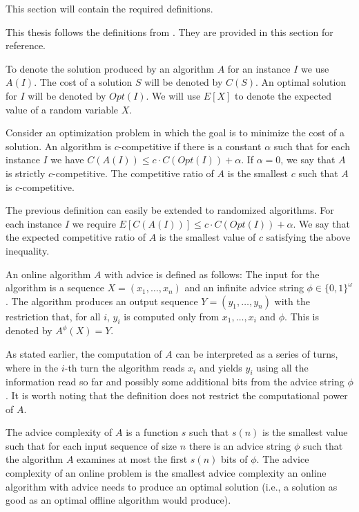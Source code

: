 This section will contain the required definitions. 


This thesis follows the definitions from \cite{misof-trivial-graphs}. They
are provided in this section for reference.

To denote the solution produced by an algorithm $A$ for an instance $I$ we
use $A(I)$. The cost of a solution $S$ will be denoted by $C(S)$. An
optimal solution for $I$ will be denoted by $Opt(I)$. We will use $E[X]$
to denote the expected value of a random variable $X$.

\begin{definition}\label{def:competitive-ratio}
    Consider an optimization problem in which the goal is to minimize the
    cost of a solution. An algorithm is $c$-competitive if there is a
    constant $\alpha$ such that for each instance $I$ we have $C(A(I))
    \leq c \cdot C(Opt(I)) + \alpha$.  If $\alpha = 0$, we say that $A$ is
    strictly $c$-competitive. The competitive ratio of $A$ is the smallest
    $c$ such that $A$ is $c$-competitive.
\end{definition}

The previous definition can easily be extended to randomized algorithms.
For each instance $I$ we require $E[C(A(I))] \leq c \cdot C(Opt(I)) +
\alpha$. We say that the expected competitive ratio of $A$ is the smallest
value of $c$ satisfying the above inequality.

\begin{definition}\label{def:online-advice}
    An online algorithm $A$ with advice is defined as follows: The input
    for the algorithm is a sequence $X = (x_1, \dots, x_n)$ and an
    infinite advice string $\phi \in \{0, 1\}^\omega$. The algorithm
    produces an output sequence $Y = (y_1, \dots, y_n)$ with the
    restriction that, for all $i$, $y_i$ is computed only from $x_1,
    \dots, x_i$ and $\phi$. This is denoted by $A^\phi(X) = Y$.
\end{definition}

As stated earlier, the computation of $A$ can be interpreted as a series
of turns, where in the $i$-th turn the algorithm reads $x_i$ and yields
$y_i$ using all the information read so far and possibly some additional
bits from the advice string $\phi$. It is worth noting that the definition
does not restrict the computational power of $A$.

\begin{definition}\label{def:advice-complexity}
    The advice complexity of $A$ is a function $s$ such that $s(n)$ is the
    smallest value such that for each input sequence of size $n$ there is
    an advice string $\phi$ such that the algorithm $A$ examines at most
    the first $s(n)$ bits of $\phi$. The advice complexity of an online
    problem is the smallest advice complexity an online algorithm with
    advice needs to produce an optimal solution (i.e., a solution as good
    as an optimal offline algorithm would produce).
\end{definition}


